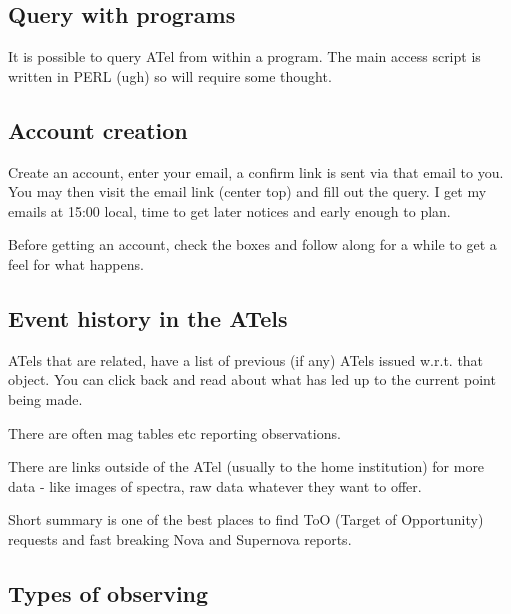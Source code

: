 \documentclass[letter,11pt,oneside]{article}
\begin{document}
\subsection{Query with programs}

It is possible to query ATel from within a program. The main access
script is written in PERL (ugh) so will require some thought.


\subsection{Account creation}

Create an account, enter your email, a confirm link is sent via that
email to you. You may then visit the email link (center top) and fill
out the query. I get my emails at 15:00 local, time to get later
notices and early enough to plan.

Before getting an account, check the boxes and follow along for a
while to get a feel for what happens.

\subsection{Event history in the ATels}

ATels that are related, have a list of previous (if any) ATels issued
w.r.t. that object. You can click back and read about what has led up
to the current point being made.

There are often mag tables etc reporting observations.

There are links outside of the ATel (usually to the home institution)
for more data - like images of spectra, raw data whatever they
want to offer.

Short summary is one of the best places to find ToO (Target of Opportunity)
requests and fast breaking Nova and Supernova reports. 

\subsection{Types of observing}
\end{document}
